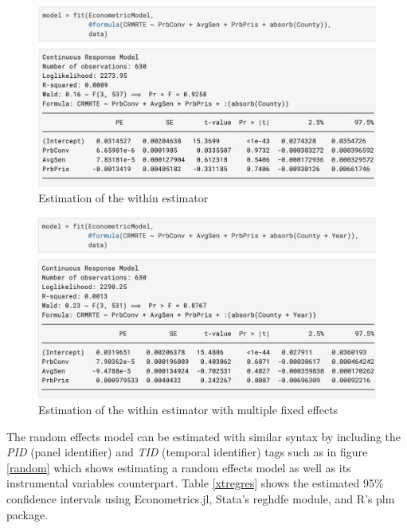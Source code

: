 \documentclass{juliacon}
\begin{document}
\begin{figure}[hbpt]
	\includegraphics[max width=\linewidth,center]{estimator_within}
	\caption{Estimation of the within estimator}
	\label{withinmodel}
\end{figure}

\begin{figure}[hbpt]
	\includegraphics[max width=\linewidth,center]{estimator_within2}
	\caption{Estimation of the within estimator with multiple fixed effects}
	\label{within2model}
\end{figure}

The random effects model can be estimated with similar syntax by including the \textit{PID} (panel identifier) and \textit{TID} (temporal identifier) tags such as in figure \vref{random} which shows estimating a random effects model as well as its instrumental variables counterpart. Table \vref{xtregres} shows the estimated 95\% confidence intervals using Econometrics.jl, Stata's reghdfe module, and R's plm package.
\end{document}
